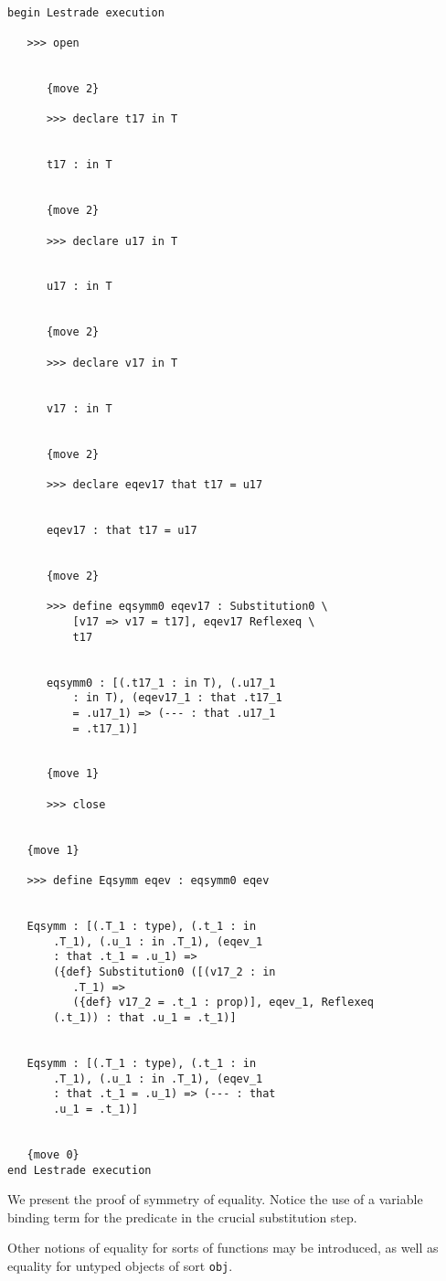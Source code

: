 \documentclass[12pt]{article}
\begin{document}
\begin{verbatim}

begin Lestrade execution

   >>> open


      {move 2}

      >>> declare t17 in T


      t17 : in T


      {move 2}

      >>> declare u17 in T


      u17 : in T


      {move 2}

      >>> declare v17 in T


      v17 : in T


      {move 2}

      >>> declare eqev17 that t17 = u17


      eqev17 : that t17 = u17


      {move 2}

      >>> define eqsymm0 eqev17 : Substitution0 \
          [v17 => v17 = t17], eqev17 Reflexeq \
          t17


      eqsymm0 : [(.t17_1 : in T), (.u17_1 
          : in T), (eqev17_1 : that .t17_1 
          = .u17_1) => (--- : that .u17_1 
          = .t17_1)]


      {move 1}

      >>> close


   {move 1}

   >>> define Eqsymm eqev : eqsymm0 eqev


   Eqsymm : [(.T_1 : type), (.t_1 : in 
       .T_1), (.u_1 : in .T_1), (eqev_1 
       : that .t_1 = .u_1) => 
       ({def} Substitution0 ([(v17_2 : in 
          .T_1) => 
          ({def} v17_2 = .t_1 : prop)], eqev_1, Reflexeq 
       (.t_1)) : that .u_1 = .t_1)]


   Eqsymm : [(.T_1 : type), (.t_1 : in 
       .T_1), (.u_1 : in .T_1), (eqev_1 
       : that .t_1 = .u_1) => (--- : that 
       .u_1 = .t_1)]


   {move 0}
end Lestrade execution
\end{verbatim}

We present the proof of symmetry of equality.  Notice the use of a variable binding term for the predicate in the crucial substitution step.

Other notions of equality for sorts of functions may be introduced, as well as equality for untyped objects of sort {\tt obj}.
\end{document}
